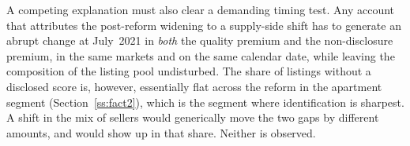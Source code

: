 A competing explanation must also clear a demanding timing test. Any account that attributes
the post-reform widening to a supply-side shift has to generate an abrupt change at
July~2021 in \emph{both} the quality premium and the non-disclosure premium, in the same
markets and on the same calendar date, while leaving the composition of the listing pool
undisturbed. The share of listings without a disclosed score is, however, essentially flat
across the reform in the apartment segment (Section~\ref{ss:fact2}), which is the segment
where identification is sharpest. A shift in the mix of sellers would generically move the
two gaps by different amounts, and would show up in that share. Neither is observed.
